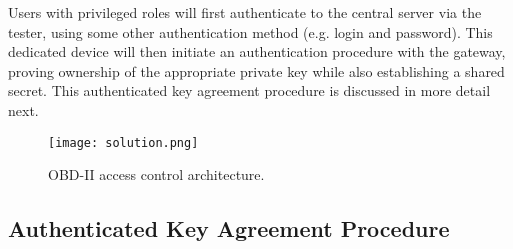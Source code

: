 Users with privileged roles will first authenticate to the central server via the tester, using some other authentication method (e.g. login and password). This dedicated device will then initiate an authentication procedure with the gateway, proving ownership of the appropriate private key while also establishing a shared secret. This authenticated key agreement procedure is discussed in more detail next.

\begin{figure}[h]
	\label{fig:solution}
	\centering
	\texttt{[image: solution.png]}
	\caption{OBD-II access control architecture.}
\end{figure}


\subsection{Authenticated Key Agreement Procedure}
\label{subsec:authenticated_key_agreement_procedure}

